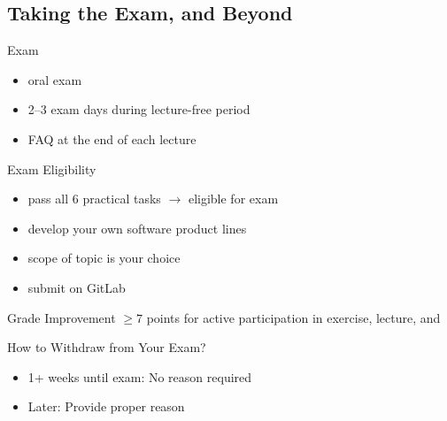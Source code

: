 


\subsection{Taking the Exam, and Beyond}

\begin{frame}[label=Exam]{\myframetitle}
	\begin{fancycolumns}
		\begin{definition}{Exam}
			\begin{itemize}
				\item oral exam %
				\item 2--3 exam days during lecture-free period
				\item FAQ at the end of each lecture
			\end{itemize}
		\end{definition}
		\begin{definition}{Exam Eligibility } %
			\begin{itemize}
				\item pass all 6 practical tasks $\rightarrow$ eligible for exam
				\item develop your own software product lines
				\item scope of topic is your choice
				\item submit on GitLab
			\end{itemize}
		\end{definition}
		\begin{definition}{Grade Improvement } %
			$\geq 7$ points for active participation in exercise, lecture, and \Panda
		\end{definition}
	\nextcolumn
		
		\begin{note}{How to Withdraw from Your Exam?}
			\begin{itemize}
				\item 1+ weeks until exam: No reason required
				\item Later: Provide proper reason
			\end{itemize}
		\end{note}	


\end{fancycolumns}
\end{frame}
